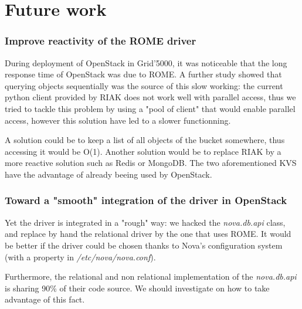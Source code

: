 \chapter{Future work}
\label{sec:future_work}

\subsection{Improve reactivity of the ROME driver}

During deployment of OpenStack in Grid'5000, it was noticeable that the long
response time of OpenStack was due to ROME. A further study showed that querying
objects sequentially was the source of this slow working: the current python
client provided by RIAK does not work well with parallel access, thus we tried
to tackle this problem by using a "pool of client" that would enable parallel
access, however this solution have led to a slower functionning.

A solution could be to keep a list of all objects of the bucket somewhere, thus
accessing it would be O(1). Another solution would be to replace RIAK by a more
reactive solution such as Redis or MongoDB. The two aforementioned KVS have the
advantage of already beeing used by OpenStack.


\subsection{Toward a "smooth" integration of the driver in OpenStack}

Yet the driver is integrated in a "rough" way: we hacked the \emph{nova.db.api}
class, and replace by hand the relational driver by the one that uses ROME. It
would be better if the driver could be chosen thanks to Nova's configuration
system (with a property in \emph{/etc/nova/nova.conf}).

Furthermore, the relational and non relational implementation of the
\emph{nova.db.api} is sharing 90\% of their code source. We should investigate
on how to take advantage of this fact.